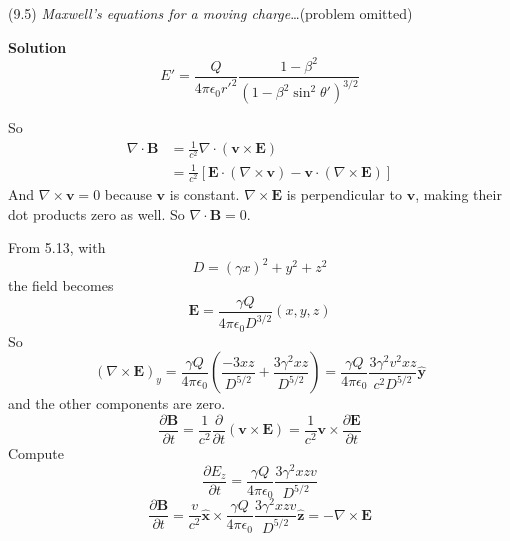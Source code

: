 \documentclass{article}
\begin{document}
\begin{homeworkProblem}
	(9.5) \textit{Maxwell's equations for a moving charge}\ldots (problem omitted)

	\textbf{Solution}
	\begin{equation}\tag{5.13}
		E'=\frac{Q}{4\pi\epsilon_0{r'}^2}\frac{1-\beta^2}{{(1-\beta^2\sin^2\theta')}^{3/2}}
	\end{equation}
	\begin{enumerate}[label = (\alph*)]
		\begin{item}
			So
			\begin{align*}
				\nabla\cdot\mathbf{B}&=\frac{1}{c^2}\nabla\cdot(\mathbf{v}\times\mathbf{E}) \\
				&=\frac{1}{c^2}\left[\mathbf{E}\cdot(\nabla\times\mathbf{v})-\mathbf{v}\cdot(\nabla\times\mathbf{E})\right]
			\end{align*}
			And $\nabla\times\mathbf{v}=0$ because $\mathbf{v}$ is constant. $\nabla\times\mathbf{E}$ is perpendicular to $\mathbf{v}$, making their dot products zero as well. So $\nabla\cdot\mathbf{B}=0$.
		\end{item}
		\begin{item}
			From 5.13, with
			\[
				D={(\gamma x)}^2+y^2+z^2
			\]
			the field becomes
			\[
				\mathbf{E}=\frac{\gamma Q}{4\pi\epsilon_0D^{3/2}}(x,y,z)
			\]
			So
			\[
				{(\nabla\times\mathbf{E})}_y=\frac{\gamma Q}{4\pi\epsilon_0}\left(\frac{-3xz}{D^{5/2}}+\frac{3\gamma^2xz}{D^{5/2}}\right)=\frac{\gamma Q}{4\pi\epsilon_0}\frac{3\gamma^2v^2xz}{c^2D^{5/2}}\hat{\mathbf{y}}
			\]
			and the other components are zero.
			\[
				\frac{\partial\mathbf{B}}{\partial t}=\frac{1}{c^2}\frac{\partial}{\partial t}(\mathbf{v}\times\mathbf{E})=\frac{1}{c^2}\mathbf{v}\times\frac{\partial\mathbf{E}}{\partial t}
			\]
			Compute
			\[
				\frac{\partial E_z}{\partial t}=\frac{\gamma Q}{4\pi\epsilon_0}\frac{3\gamma^2xzv}{D^{5/2}}
			\]
			\[
				\frac{\partial\mathbf{B}}{\partial t}=\frac{v}{c^2}\hat{\mathbf{x}}\times\frac{\gamma Q}{4\pi\epsilon_0}\frac{3\gamma^2xzv}{D^{5/2}}\hat{\mathbf{z}}=-\nabla\times\mathbf{E}
			\]
		\end{item}
	\end{enumerate}
\end{homeworkProblem}

\end{document}
